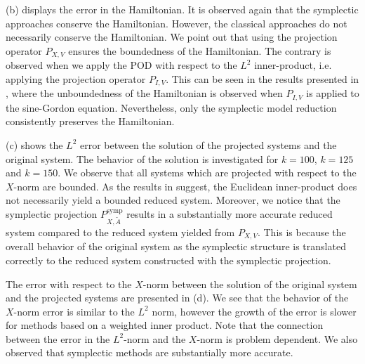 (b) displays the error in the Hamiltonian. It is observed again that the symplectic approaches conserve the Hamiltonian. However, the classical approaches do not necessarily conserve the Hamiltonian. We point out that using the projection operator $P_{X,V}$ ensures the boundedness of the Hamiltonian. The contrary is observed when we apply the POD with respect to the $L^2$ inner-product, i.e. applying the projection operator $P_{I,V}$. This can be seen in the results presented in \cite{doi:10.1137/140978922}, where the unboundedness of the Hamiltonian is observed when $P_{I,V}$ is applied to the sine-Gordon equation. Nevertheless, only the symplectic model reduction consistently preserves the Hamiltonian.

(c) shows the $L^2$ error between the solution of the projected systems and the original system. The behavior of the solution is investigated for $k=100$, $k=125$ and $k=150$. We observe that all systems which are projected with respect to the $X$-norm are bounded. As the results in \cite{doi:10.1137/140978922} suggest, the Euclidean inner-product does not necessarily yield a bounded reduced system. Moreover, we notice that the symplectic projection $P^{\text{symp}}_{X,\tilde A}$ results in a substantially more accurate reduced system compared to the reduced system yielded from $P_{X,V}$. This is because the overall behavior of the original system as the symplectic structure is translated correctly to the reduced system constructed with the symplectic projection.

The error with respect to the $X$-norm between the solution of the original system and the projected systems are presented in (d). We see that the behavior of the $X$-norm error is similar to the $L^2$ norm, however the growth of the error is slower for methods based on a weighted inner product. Note that the connection between the error in the $L^2$-norm and the $X$-norm is problem dependent. We also observed that symplectic methods are substantially more accurate.

